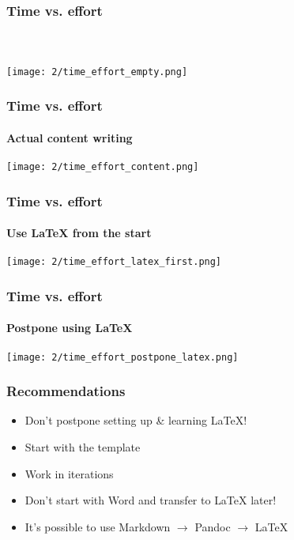 \documentclass[aspectratio=169]{beamer}
\begin{document}
\begin{frame}
	\frametitle{Time vs. effort}
	\framesubtitle{~}
	
	\begin{center}
		\texttt{[image: 2/time\_effort\_empty.png]}
	\end{center}
	
\end{frame}

\begin{frame}
	\frametitle{Time vs. effort}
	\framesubtitle{Actual content writing}
	
	\begin{center}
		\texttt{[image: 2/time\_effort\_content.png]}
	\end{center}
	
\end{frame}

\begin{frame}
	\frametitle{Time vs. effort}
	\framesubtitle{Use {\LaTeX} from the start}
	
	\begin{center}
		\texttt{[image: 2/time\_effort\_latex\_first.png]}
	\end{center}
	
\end{frame}

\begin{frame}
	\frametitle{Time vs. effort}
	\framesubtitle{{Postpone using \LaTeX}}
	
	\begin{center}
		\texttt{[image: 2/time\_effort\_postpone\_latex.png]}
	\end{center}
	
\end{frame}

\begin{frame}
	\frametitle{Recommendations}
	
	\begin{itemize}
		\item Don't postpone setting up \& learning {\LaTeX}!
		\item Start with the template
		\item Work in iterations
		\item \alert{Don't start with Word and transfer to {\LaTeX} later!}
		\item It's possible to use Markdown $\rightarrow$ Pandoc $\rightarrow$ {\LaTeX}
	\end{itemize}
	
\end{frame}
\end{document}
